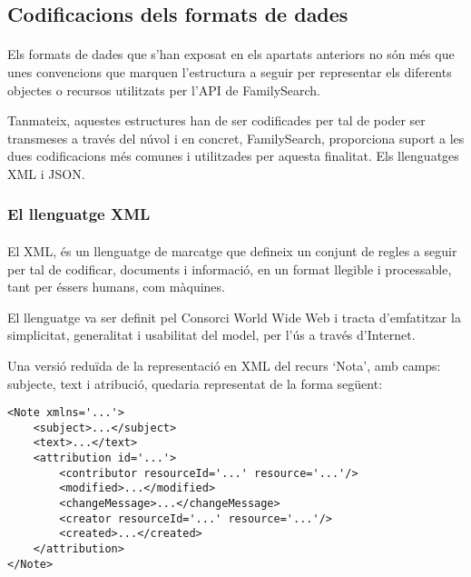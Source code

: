     \subsection{Codificacions dels formats de dades}

        \paragraph{}
        Els formats de dades que s’han exposat en els apartats anteriors no són més que unes convencions que marquen l'estructura a seguir per representar els diferents objectes o recursos utilitzats per l'API de FamilySearch.

        Tanmateix, aquestes estructures han de ser codificades per tal de poder ser transmeses a través del núvol i en concret, FamilySearch, proporciona suport a les dues codificacions més comunes i utilitzades per aquesta finalitat. Els llenguatges XML i JSON.


        \subsubsection{El llenguatge XML}

        \paragraph{}
        El \gls{XML}, és un llenguatge de marcatge que defineix un conjunt de regles a seguir per tal de codificar, documents i informació, en un format llegible i processable, tant per éssers humans, com màquines.

        El llenguatge va ser definit pel Consorci World Wide Web i tracta d’emfatitzar la simplicitat, generalitat i usabilitat del model, per l'ús a través d'Internet.

        Una versió reduïda de la representació en XML del recurs ‘Nota’, amb camps: subjecte, text i atribució, quedaria representat de la forma següent:

        \begin{lstlisting}[style=rawOwn,caption={Representació bàsica en XML d'una Nota}]
<Note xmlns='...'>
    <subject>...</subject>
    <text>...</text>
    <attribution id='...'>
        <contributor resourceId='...' resource='...'/>
        <modified>...</modified>
        <changeMessage>...</changeMessage>
        <creator resourceId='...' resource='...'/>
        <created>...</created>
    </attribution>
</Note>
        \end{lstlisting}

